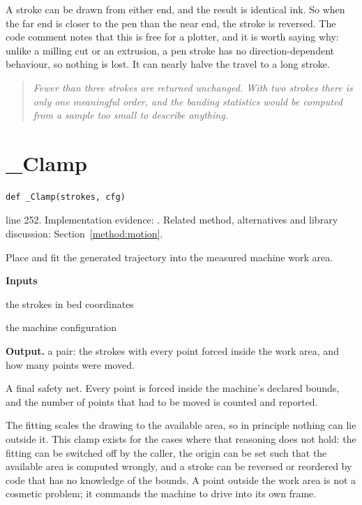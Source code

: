 A stroke can be drawn from either end, and the result is identical ink. So when the far end is closer to the pen than the near end, the stroke is reversed. The code comment notes that this is free for a plotter, and it is worth saying why: unlike a milling cut or an extrusion, a pen stroke has no direction-dependent behaviour, so nothing is lost. It can nearly halve the travel to a long stroke.


\begin{quote}\small\itshape Fewer than three strokes are returned unchanged. With two strokes there is only one meaningful order, and the banding statistics would be computed from a sample too small to describe anything.\end{quote}


\section{\_Clamp}\label{fn:reproduce:-Clamp}
\begin{lstlisting}[style=sig]
def _Clamp(strokes, cfg)
\end{lstlisting}
 line 252. Implementation evidence: \cite{code2026}. Related method, alternatives and library discussion: Section~\ref{method:motion}.


Place and fit the generated trajectory into the measured machine work area.




\noindent\textbf{Inputs}
\begin{description}[leftmargin=2.2em,style=nextline,font=\normalfont\ttfamily]\setlength\itemsep{1pt}
  \item[{strokes}] \normalfont the strokes in bed coordinates
  \item[{cfg}] \normalfont the machine configuration
\end{description}

\noindent\textbf{Output.} a pair: the strokes with every point forced inside the work area, and how many points were moved.


A final safety net. Every point is forced inside the machine's declared bounds, and the number of points that had to be moved is counted and reported.


The fitting scales the drawing to the available area, so in principle nothing can lie outside it. This clamp exists for the cases where that reasoning does not hold: the fitting can be switched off by the caller, the origin can be set such that the available area is computed wrongly, and a stroke can be reversed or reordered by code that has no knowledge of the bounds. A point outside the work area is not a cosmetic problem; it commands the machine to drive into its own frame.



